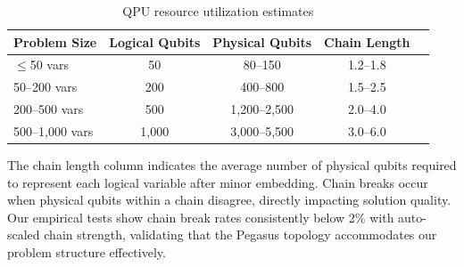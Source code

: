 \documentclass{oqireport}
\begin{document}
\begin{table}[H]
\centering
\caption{QPU resource utilization estimates}
\label{tab:qpu_resources}
\begin{tabular}{@{}lcccc@{}}
\toprule
\textbf{Problem Size} & \textbf{Logical Qubits} & \textbf{Physical Qubits} & \textbf{Chain Length} \\
\midrule
$\leq$50 vars & 50 & 80--150 & 1.2--1.8 \\
50--200 vars & 200 & 400--800 & 1.5--2.5  \\
200--500 vars & 500 & 1,200--2,500 & 2.0--4.0  \\
500--1,000 vars & 1,000 & 3,000--5,500 & 3.0--6.0  \\
\bottomrule
\end{tabular}
\end{table}

The chain length column indicates the average number of physical qubits required to represent each logical variable after minor embedding. Chain breaks occur when physical qubits within a chain disagree, directly impacting solution quality. Our empirical tests show chain break rates consistently below 2\% with auto-scaled chain strength, validating that the Pegasus topology accommodates our problem structure effectively.



\end{document}
